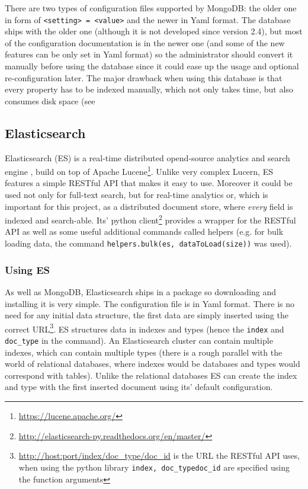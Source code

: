 There are two types
of configuration files supported by MongoDB: the older one in form of \texttt{<setting> = <value>} and the 
newer in Yaml format. The database ships with the older one (although it is not developed since version 2.4), but
most of the configuration documentation is in the newer one (and some of the new features can be only set in 
Yaml format) so the administrator should convert it manually before using the database since it could ease up
the usage and optional re-configuration later.
The major drawback when using this database is that every property has to be indexed manually, which not only 
takes time, but also consumes disk space (see %

\subsection{Elasticsearch}

Elasticsearch (ES) is a real-time distributed opend-source analytics and search engine \cite{ESBook}, 
build on top of Apache Lucene\footnote{\url{https://lucene.apache.org/}}. Unlike very complex Lucern, 
ES features a simple RESTful API that makes it easy to use. Moreover it could be used not only 
for full-text search, but for real-time analytics or, which is important for this project, as a 
distributed document store, where \textit{every} field is indexed and search-able. Its' python 
client\footnote{\url{http://elasticsearch-py.readthedocs.org/en/master/}} provides a wrapper for the RESTful API
as well as some useful additional commands called helpers (e.g. for bulk loading data, the command 
\texttt{helpers.bulk(es, dataToLoad(size))} was used).

\subsubsection{Using ES}

As well as MongoDB, Elasticsearch ships in a package so downloading and installing it is very simple. The 
configuration file is in Yaml format. There is no need for any initial data structure,
the first data are simply inserted using the correct URL\footnote{\url{http://host:port/index/doc_type/doc_id}
is the URL the RESTful API uses, when using the python library \texttt{index, doc\_type}\texttt{doc\_id} are 
specified using the function arguments}. ES structures data in indexes and types (hence the \texttt{index} and
\texttt{doc\_type} in the command). An Elasticsearch cluster can contain multiple indexes, which can contain 
multiple types (there is a rough parallel with the world of relational databases, where indexes would be databases 
and types would correspond with tables). Unlike the relational databases ES can create the index and type with the 
first inserted document using its' default configuration.

